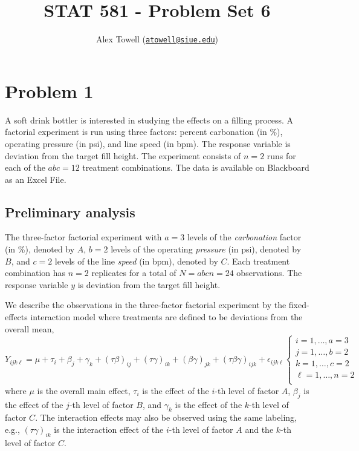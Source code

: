 \documentclass[
  11pt,
]{article}
\title{STAT 581 - Problem Set 6}
\author{Alex Towell
(\href{mailto:atowell@siue.edu}{\nolinkurl{atowell@siue.edu}})}
\date{}
\begin{document}
\maketitle

\hypertarget{problem-1}{%
\section{Problem 1}\label{problem-1}}

A soft drink bottler is interested in studying the effects on a filling
process. A factorial experiment is run using three factors: percent
carbonation (in \%), operating pressure (in psi), and line speed (in
bpm). The response variable is deviation from the target fill height.
The experiment consists of \(n=2\) runs for each of the \(a b c = 12\)
treatment combinations. The data is available on Blackboard as an Excel
File.

\hypertarget{preliminary-analysis}{%
\subsection{Preliminary analysis}\label{preliminary-analysis}}

The three-factor factorial experiment with \(a=3\) levels of the
\emph{carbonation} factor (in \%), denoted by \(A\), \(b=2\) levels of
the operating \emph{pressure} (in psi), denoted by \(B\), and \(c=2\)
levels of the line \emph{speed} (in bpm), denoted by \(C\). Each
treatment combination has \(n=2\) replicates for a total of
\(N=a b c n=24\) observations. The response variable \(y\) is deviation
from the target fill height.

We describe the observations in the three-factor factorial experiment by
the fixed-effects interaction model where treatments are defined to be
deviations from the overall mean, \[
  Y_{i j k \ell} = \mu + \tau_i + \beta_j + \gamma_k +
                   (\tau\!\beta)_{i j} + (\tau\!\gamma)_{i k} +
                   (\beta\!\gamma)_{j k} + (\tau\!\beta\gamma)_{i j k} +
                   \epsilon_{i j k \ell}
  \begin{cases}
    i = 1,\ldots,a=3\\
    j = 1,\ldots,b=2\\
    k = 1,\ldots,c=2\\
    \ell = 1,\ldots,n=2\\
  \end{cases}
\] where \(\mu\) is the overall main effect, \(\tau_i\) is the effect of
the \(i\)-th level of factor \(A\), \(\beta_j\) is the effect of the
\(j\)-th level of factor \(B\), and \(\gamma_k\) is the effect of the
\(k\)-th level of factor \(C\). The interaction effects may also be
observed using the same labeling, e.g., \((\tau\!\gamma)_{i k}\) is the
interaction effect of the \(i\)-th level of factor \(A\) and the
\(k\)-th level of factor \(C\).
\end{document}
